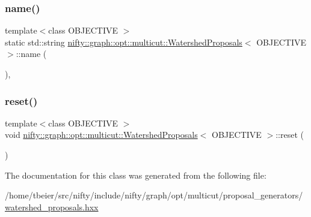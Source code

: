\mbox{\label{classnifty_1_1graph_1_1opt_1_1multicut_1_1WatershedProposals_a2fcdf9019b48369fe66806d87be937dc}} 
\subsubsection{\texorpdfstring{name()}{name()}}
{\footnotesize\ttfamily template$<$class O\+B\+J\+E\+C\+T\+I\+VE $>$ \\
static std\+::string \hyperlink{classnifty_1_1graph_1_1opt_1_1multicut_1_1WatershedProposals}{nifty\+::graph\+::opt\+::multicut\+::\+Watershed\+Proposals}$<$ O\+B\+J\+E\+C\+T\+I\+VE $>$\+::name (\begin{DoxyParamCaption}{ }\end{DoxyParamCaption})\hspace{0.3cm}{\ttfamily [inline]}, {\ttfamily [static]}}

\mbox{\label{classnifty_1_1graph_1_1opt_1_1multicut_1_1WatershedProposals_a4b51334351431bc1e232d52605580931}} 
\subsubsection{\texorpdfstring{reset()}{reset()}}
{\footnotesize\ttfamily template$<$class O\+B\+J\+E\+C\+T\+I\+VE $>$ \\
void \hyperlink{classnifty_1_1graph_1_1opt_1_1multicut_1_1WatershedProposals}{nifty\+::graph\+::opt\+::multicut\+::\+Watershed\+Proposals}$<$ O\+B\+J\+E\+C\+T\+I\+VE $>$\+::reset (\begin{DoxyParamCaption}{ }\end{DoxyParamCaption})\hspace{0.3cm}{\ttfamily [inline]}}



The documentation for this class was generated from the following file\+:\begin{DoxyCompactItemize}
\item 
/home/tbeier/src/nifty/include/nifty/graph/opt/multicut/proposal\+\_\+generators/\hyperlink{watershed__proposals_8hxx}{watershed\+\_\+proposals.\+hxx}\end{DoxyCompactItemize}
